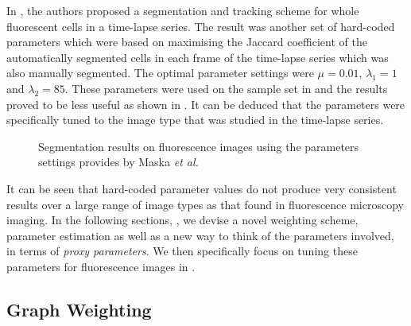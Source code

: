 In \citep{Maska2013}, the authors proposed a segmentation and tracking scheme for whole fluorescent cells in a time-lapse series. The result was another set of hard-coded parameters which were based on maximising the Jaccard coefficient of the automatically segmented cells in each frame of the time-lapse series which was also manually segmented. The optimal parameter settings were $\mu=0.01$, $\lambda_1=1$ and $\lambda_2 = 85$. These parameters were used on the sample set in  and the results proved to be less useful as shown in . It can be deduced that the parameters were specifically tuned to the image type that was studied in the time-lapse series.

\begin{figure}[!t]
	\centering
	\caption{Segmentation results on fluorescence images using the parameters settings provides by Maska \textit{et al.}}
	\label{fig:samplesetcelltrack}
\end{figure}

It can be seen that hard-coded parameter values do not produce very consistent results over a large range of image types as that found in fluorescence microscopy imaging. In the following sections, , we devise a novel weighting scheme, parameter estimation as well as a new way to think of the parameters involved, in terms of \textit{proxy parameters}. We then specifically focus on tuning these parameters for fluorescence images in .

\subsection{Graph Weighting}
\label{sec:cvgc_weighting}

